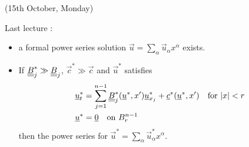 \documentclass[12pt,a4paper]{report}
\begin{document}
\newday

(15th October, Monday)
\s

Last lecture :
\begin{itemize}
\item a formal power series solution $\vec{u} = \sum_{\alpha} \vec{u}_{\alpha} x^{\alpha}$ exists.

\item If $\underline{\underline{B}}^*_j \gg \underline{\underline{B}}_j$, $\vec{c}^* \gg \vec{c}$ and $\vec{u}^*$ satisfies
\begin{align*}
\underline{u}^*_t &= \sum_{j=1}^{n-1} \underline{\underline{B}}^*_j (\underline{u}^*, x') \underline{u}^*_{x_j} + \underline{c}^*(\underline{u}^*,x') \quad \text{for } |x| <r \\
\underline{u}^* &= \underline{0} \quad \text{on } B_r^{n-1}
\end{align*}
then the power series for $\vec{u}^* = \sum_{\alpha} \vec{u}^*_{\alpha} x^{\alpha}$.
\end{itemize}
\end{document}
